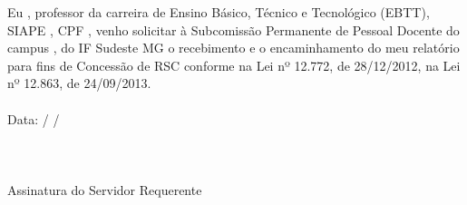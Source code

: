 Eu \textbf{\underline{\the\nomeservidor}}, professor da carreira de Ensino Básico, Técnico e Tecnológico (EBTT), SIAPE \textbf{\underline{\the\siape}}, CPF \textbf{\underline{\the\cpf}}, venho solicitar à Subcomissão Permanente de Pessoal Docente do campus \textbf{\underline{\the\campus}}, do IF Sudeste MG o recebimento e o encaminhamento do meu relatório para fins de Concessão de RSC conforme na Lei nº 12.772, de 28/12/2012, na Lei nº 12.863, de 24/09/2013.
\\
\\
Data: \underline{\hspace{0.3in}} / \underline{\hspace{0.3in}} / \underline{\hspace{0.3in}}
\\
\\
\\
\underline{\hspace{5in}}\\
Assinatura do Servidor Requerente


